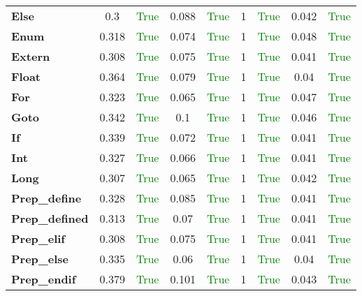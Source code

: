 \documentclass{article}
\begin{document}
\begin{xltabular}{\textwidth}{lcccccccc}
\textbf{Else}& 0.3&\textcolor{green}{True}& 0.088&\textcolor{green}{True}& 1&\textcolor{green}{True}& 0.042&\textcolor{green}{True} \\[0.5ex]
\textbf{Enum}& 0.318&\textcolor{green}{True}& 0.074&\textcolor{green}{True}& 1&\textcolor{green}{True}& 0.048&\textcolor{green}{True} \\[0.5ex]
\textbf{Extern}& 0.308&\textcolor{green}{True}& 0.075&\textcolor{green}{True}& 1&\textcolor{green}{True}& 0.041&\textcolor{green}{True} \\[0.5ex]
\textbf{Float}& 0.364&\textcolor{green}{True}& 0.079&\textcolor{green}{True}& 1&\textcolor{green}{True}& 0.04&\textcolor{green}{True} \\[0.5ex]
\textbf{For}& 0.323&\textcolor{green}{True}& 0.065&\textcolor{green}{True}& 1&\textcolor{green}{True}& 0.047&\textcolor{green}{True} \\[0.5ex]
\textbf{Goto}& 0.342&\textcolor{green}{True}& 0.1&\textcolor{green}{True}& 1&\textcolor{green}{True}& 0.046&\textcolor{green}{True} \\[0.5ex]
\textbf{If}& 0.339&\textcolor{green}{True}& 0.072&\textcolor{green}{True}& 1&\textcolor{green}{True}& 0.041&\textcolor{green}{True} \\[0.5ex]
\textbf{Int}& 0.327&\textcolor{green}{True}& 0.066&\textcolor{green}{True}& 1&\textcolor{green}{True}& 0.041&\textcolor{green}{True} \\[0.5ex]
\textbf{Long}& 0.307&\textcolor{green}{True}& 0.065&\textcolor{green}{True}& 1&\textcolor{green}{True}& 0.042&\textcolor{green}{True} \\[0.5ex]
\textbf{Prep\_define}& 0.328&\textcolor{green}{True}& 0.085&\textcolor{green}{True}& 1&\textcolor{green}{True}& 0.041&\textcolor{green}{True} \\[0.5ex]
\textbf{Prep\_defined}& 0.313&\textcolor{green}{True}& 0.07&\textcolor{green}{True}& 1&\textcolor{green}{True}& 0.041&\textcolor{green}{True} \\[0.5ex]
\textbf{Prep\_elif}& 0.308&\textcolor{green}{True}& 0.075&\textcolor{green}{True}& 1&\textcolor{green}{True}& 0.041&\textcolor{green}{True} \\[0.5ex]
\textbf{Prep\_else}& 0.335&\textcolor{green}{True}& 0.06&\textcolor{green}{True}& 1&\textcolor{green}{True}& 0.04&\textcolor{green}{True} \\[0.5ex]
\textbf{Prep\_endif}& 0.379&\textcolor{green}{True}& 0.101&\textcolor{green}{True}& 1&\textcolor{green}{True}& 0.043&\textcolor{green}{True} \\[0.5ex]

\end{xltabular}
\end{document}
